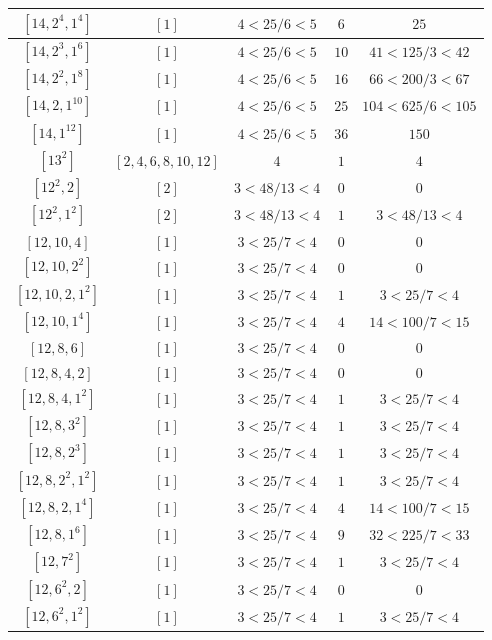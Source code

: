 \documentclass{article}%
\begin{document}
\begin{center}
\begin{longtable}{||c|c|c|c|c||}
$[14, 2^{4}, 1^{4}]$ & $[1]$ & $4 < 25/6 < 5$ & $6$ & $25$ \\ \hline 
$[14, 2^{3}, 1^{6}]$ & $[1]$ & $4 < 25/6 < 5$ & $10$ & $41 < 125/3 < 42$ \\ \hline 
$[14, 2^{2}, 1^{8}]$ & $[1]$ & $4 < 25/6 < 5$ & $16$ & $66 < 200/3 < 67$ \\ \hline 
$[14, 2, 1^{10}]$ & $[1]$ & $4 < 25/6 < 5$ & $25$ & $104 < 625/6 < 105$ \\ \hline 
$[14, 1^{12}]$ & $[1]$ & $4 < 25/6 < 5$ & $36$ & $150$ \\ \hline 
$[13^{2}]$ & $[2, 4, 6, 8, 10, 12]$ & $4$ & $1$ & $4$ \\ \hline 
$[12^{2}, 2]$ & $[2]$ & $3 < 48/13 < 4$ & $0$ & $0$ \\ \hline 
$[12^{2}, 1^{2}]$ & $[2]$ & $3 < 48/13 < 4$ & $1$ & $3 < 48/13 < 4$ \\ \hline 
$[12, 10, 4]$ & $[1]$ & $3 < 25/7 < 4$ & $0$ & $0$ \\ \hline 
$[12, 10, 2^{2}]$ & $[1]$ & $3 < 25/7 < 4$ & $0$ & $0$ \\ \hline 
$[12, 10, 2, 1^{2}]$ & $[1]$ & $3 < 25/7 < 4$ & $1$ & $3 < 25/7 < 4$ \\ \hline 
$[12, 10, 1^{4}]$ & $[1]$ & $3 < 25/7 < 4$ & $4$ & $14 < 100/7 < 15$ \\ \hline 
$[12, 8, 6]$ & $[1]$ & $3 < 25/7 < 4$ & $0$ & $0$ \\ \hline 
$[12, 8, 4, 2]$ & $[1]$ & $3 < 25/7 < 4$ & $0$ & $0$ \\ \hline 
$[12, 8, 4, 1^{2}]$ & $[1]$ & $3 < 25/7 < 4$ & $1$ & $3 < 25/7 < 4$ \\ \hline 
$[12, 8, 3^{2}]$ & $[1]$ & $3 < 25/7 < 4$ & $1$ & $3 < 25/7 < 4$ \\ \hline 
$[12, 8, 2^{3}]$ & $[1]$ & $3 < 25/7 < 4$ & $1$ & $3 < 25/7 < 4$ \\ \hline 
$[12, 8, 2^{2}, 1^{2}]$ & $[1]$ & $3 < 25/7 < 4$ & $1$ & $3 < 25/7 < 4$ \\ \hline 
$[12, 8, 2, 1^{4}]$ & $[1]$ & $3 < 25/7 < 4$ & $4$ & $14 < 100/7 < 15$ \\ \hline 
$[12, 8, 1^{6}]$ & $[1]$ & $3 < 25/7 < 4$ & $9$ & $32 < 225/7 < 33$ \\ \hline 
$[12, 7^{2}]$ & $[1]$ & $3 < 25/7 < 4$ & $1$ & $3 < 25/7 < 4$ \\ \hline 
$[12, 6^{2}, 2]$ & $[1]$ & $3 < 25/7 < 4$ & $0$ & $0$ \\ \hline 
$[12, 6^{2}, 1^{2}]$ & $[1]$ & $3 < 25/7 < 4$ & $1$ & $3 < 25/7 < 4$ \\ \hline 

\end{longtable}
\end{center}
\end{document}

